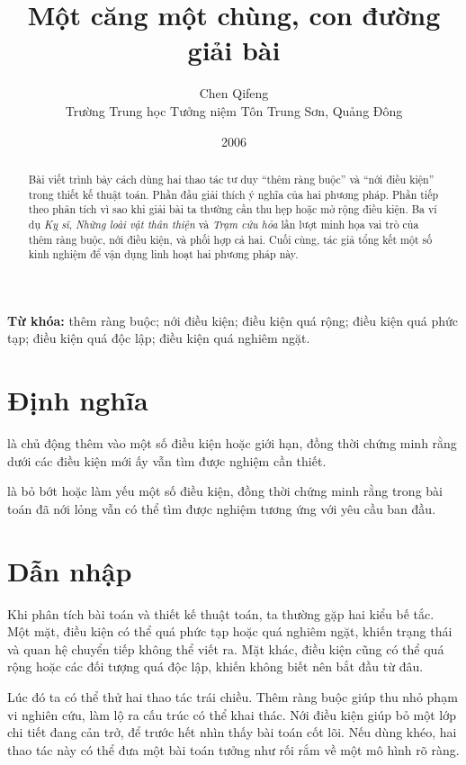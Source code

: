 \documentclass[11pt]{article}
\title{Một căng một chùng, con đường giải bài}
\author{Chen Qifeng\\Trường Trung học Tưởng niệm Tôn Trung Sơn, Quảng Đông}
\date{2006}
\begin{document}
\maketitle


\renewcommand{\abstractname}{Tóm tắt}
\begin{abstract}
Bài viết trình bày cách dùng hai thao tác tư duy ``thêm ràng buộc'' và
``nới điều kiện'' trong thiết kế thuật toán. Phần đầu giải thích ý nghĩa của
hai phương pháp. Phần tiếp theo phân tích vì sao khi giải bài ta thường cần
thu hẹp hoặc mở rộng điều kiện. Ba ví dụ \textit{Kỵ sĩ}, \textit{Những loài
vật thân thiện} và \textit{Trạm cứu hỏa} lần lượt minh họa vai trò của thêm
ràng buộc, nới điều kiện, và phối hợp cả hai. Cuối cùng, tác giả tổng kết một
số kinh nghiệm để vận dụng linh hoạt hai phương pháp này.
\end{abstract}

\noindent\textbf{Từ khóa:} thêm ràng buộc; nới điều kiện; điều kiện quá rộng;
điều kiện quá phức tạp; điều kiện quá độc lập; điều kiện quá nghiêm ngặt.

\section{Định nghĩa}

 là chủ động thêm vào một số điều kiện hoặc
giới hạn, đồng thời chứng minh rằng dưới các điều kiện mới ấy vẫn tìm được
nghiệm cần thiết.

 là bỏ bớt hoặc làm yếu một số điều kiện, đồng
thời chứng minh rằng trong bài toán đã nới lỏng vẫn có thể tìm được nghiệm
tương ứng với yêu cầu ban đầu.

\section{Dẫn nhập}

Khi phân tích bài toán và thiết kế thuật toán, ta thường gặp hai kiểu bế tắc.
Một mặt, điều kiện có thể quá phức tạp hoặc quá nghiêm ngặt, khiến trạng thái
và quan hệ chuyển tiếp không thể viết ra. Mặt khác, điều kiện cũng có thể quá
rộng hoặc các đối tượng quá độc lập, khiến không biết nên bắt đầu từ đâu.

Lúc đó ta có thể thử hai thao tác trái chiều. Thêm ràng buộc giúp thu nhỏ phạm
vi nghiên cứu, làm lộ ra cấu trúc có thể khai thác. Nới điều kiện giúp bỏ một
lớp chi tiết đang cản trở, để trước hết nhìn thấy bài toán cốt lõi. Nếu dùng
khéo, hai thao tác này có thể đưa một bài toán tưởng như rối rắm về một mô
hình rõ ràng.
\end{document}
